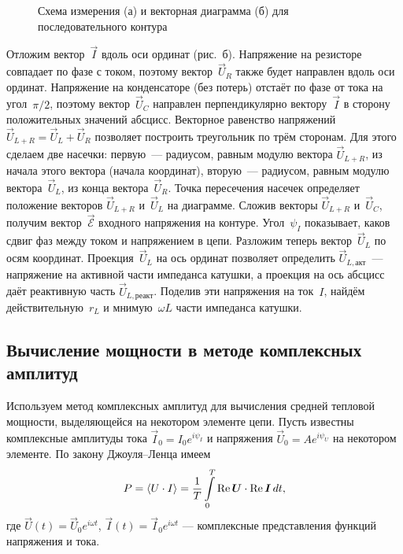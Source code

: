 \begin{figure}[h]
	\begin{minipage}[h]{0.49\linewidth}
		\centering
	\end{minipage}
	\hfill
	\begin{minipage}[h]{0.49\linewidth}
		\centering
	\end{minipage}
	\caption{Схема измерения (а) и векторная  диаграмма (б) для
последовательного контура}
\end{figure}

Отложим вектор~$\vec I$ вдоль оси ординат (рис.~б). Напряжение на
резисторе совпадает по фазе с током, поэтому вектор~$\vec U_R$ также будет
направлен вдоль оси ординат. Напряжение на конденсаторе (без потерь) отстаёт по
фазе от тока на угол~$\pi/2$, поэтому вектор~$\vec{U}_{\! C}$ направлен
перпендикулярно вектору~$\vec I$ в сторону положительных значений абсцисс.
Векторное равенство напряжений $\vec U_{L+R}=\vec U_L+\vec U_R$ позволяет
построить треугольник по трём сторонам. Для этого сделаем две насечки:
первую~--- радиусом, равным модулю вектора $\vec U_{L+R}$, из начала этого
вектора (начала координат), вторую~--- радиусом, равным модулю вектора~$\vec
U_L$, из конца вектора~$\vec U_R$. Точка пересечения насечек определяет
положение векторов $\vec U_{L+R}$ и~$\vec U_L$ на диаграмме. Сложив векторы
$\vec{U}_{L+R}$ и~$\vec{U}_{\! C}$, получим вектор~$\vec{\mathcal{E}}$ входного
напряжения на контуре. Угол~$\psi_I$ показывает, каков сдвиг фаз между током и
напряжением в цепи. Разложим теперь вектор~$\vec U_L$ по осям координат.
Проекция~$\vec U_L$ на ось ординат позволяет определить $\vec
U_{L,\text{акт}}$~--- напряжение на активной части импеданса катушки, а проекция
на ось абсцисс даёт реактивную часть $\vec U_{L,\text{реакт}}$. Поделив эти
напряжения на ток~$I$, найдём действительную~$r_L$ и мнимую~$\omega L$ части
импеданса катушки.

\subsection{Вычисление мощности в методе комплексных амплитуд}
Используем метод комплексных амплитуд для вычисления 
средней тепловой мощности, выделяющейся на некотором элементе цепи.
Пусть известны комплексные амплитуды тока $\vec{I}_0=I_0 e^{i\psi_I}$ и напряжения
$\vec{U}_0 = A  e^{i\psi_U}$ на некотором элементе. 
По закону Джоуля--Ленца имеем
\begin{equation}
\eqmark{JoulLentz}
P = \left< U\cdot I \right> = \frac1{T} \int\limits_0^T \Re \vec{U} \cdot \Re \vec{I}\, dt,
\end{equation}
где $\vec{U}(t) = \vec{U}_0 e^{i\omega t}$, 
$\vec{I}(t) = \vec{I}_0 e^{i\omega t}$ --- комплексные представления 
функций напряжения и тока.

